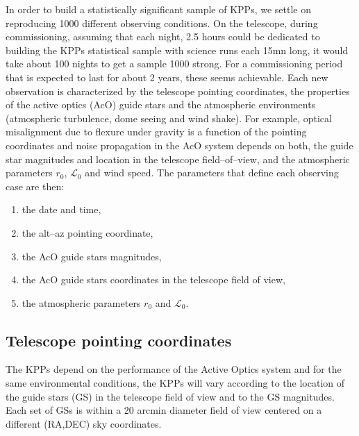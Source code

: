 \documentclass{gmto}
\begin{document}
In order to build a statistically significant sample of KPPs, we settle on
reproducing 1000 different observing conditions.
On the telescope, during commissioning, assuming that each night, 2.5 hours could
be dedicated to building the KPPs statistical sample with science runs each 15mn
long, it would take about 100 nights to get a sample 1000 strong.
For a commissioning period that is expected to last for about 2 years, these
seems achievable.
Each new observation is characterized by the telescope pointing coordinates, the
properties of the active optics (AcO) guide stars and the atmospheric environments
(atmospheric turbulence, dome seeing and wind shake).
For example, optical misalignment due to flexure under gravity is a function of
the pointing coordinates and noise propagation in the AcO system depends on both,
the guide star magnitudes and location in the telescope field--of--view, and the
atmospheric parameters $r_0$, $\mathcal L_0$ and wind speed.
The parameters that define each observing case are then:
\begin{enumerate}
\item the date and time,
\item the alt--az pointing coordinate,
\item the AcO guide stars magnitudes,
\item the AcO guide stars coordinates in the telescope field of view,
\item the atmospheric parameters $r_0$ and $\mathcal L_0$.
\end{enumerate}

\subsection{Telescope pointing coordinates}
\label{sec:pointing-coord}


The KPPs depend on the performance of the Active Optics system and for the same
environmental conditions, the KPPs will vary according to the location of the guide
stars (GS) in the telescope field of view and to the GS magnitudes.
Each set of GSs is within a 20 arcmin diameter field of view centered on a different
(RA,DEC) sky coordinates.
\end{document}
